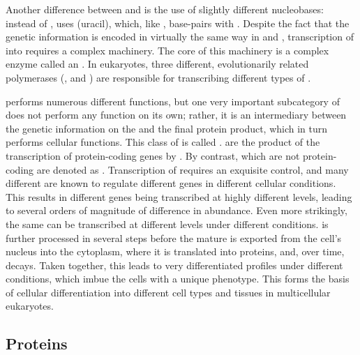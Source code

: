 Another difference between \dna and \rna is the use of slightly different
nucleobases: instead of \nT, \rna uses \nU (uracil), which, like \nT, base-pairs
with \nA. Despite the fact that the genetic information is encoded in virtually
the same way in \dna and \rna, transcription of \dna into \rna requires a
complex machinery. The core of this machinery is a complex enzyme called an
. In eukaryotes, three different, evolutionarily related
\rna polymerases (,  and ) are responsible for transcribing
different types of \rna.

\rna performs numerous different functions, but one very important subcategory
of \rna does not perform any function on its own; rather, it is an intermediary
between the genetic information on the \dna and the final protein product, which
in turn performs cellular functions. This class of \rna is called \mrna.
\mrna[s] are the product of the transcription of protein-coding genes by .
By contrast, \rna[s] which are not protein-coding are denoted as \ncrna.
Transcription of \mrna requires an exquisite control, and many different \tf[s]
are known to regulate different genes in different cellular conditions. This
results in different \mrna genes being transcribed at highly different levels,
leading to several orders of magnitude of difference in \mrna abundance. Even
more strikingly, the same \mrna can be transcribed at different levels under
different conditions. \mrna is further processed in several steps before the
mature \mrna is exported from the cell’s nucleus into the cytoplasm, where it is
translated into proteins, and, over time, decays. Taken together, this leads to
very differentiated \mrna profiles under different conditions, which imbue the
cells with a unique phenotype. This forms the basis of cellular differentiation
into different cell types and tissues in multicellular eukaryotes.

\subsection{Proteins}

